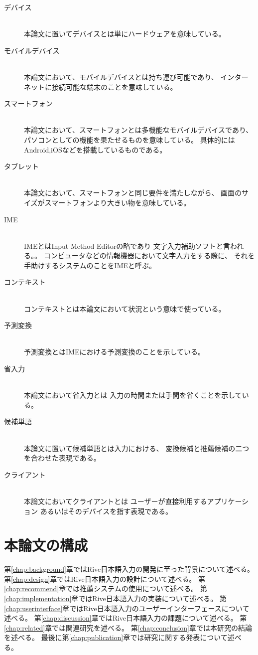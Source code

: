 \begin{description}
  \item[デバイス]\mbox{}\\
    本論文に置いてデバイスとは単にハードウェアを意味している。
  \item[モバイルデバイス]\mbox{}\\
    本論文において、モバイルデバイスとは持ち運び可能であり、
    インターネットに接続可能な端末のことを意味している。
  \item[スマートフォン]\mbox{}\\
    本論文において、スマートフォンとは多機能なモバイルデバイスであり、
    パソコンとしての機能を果たせるものを意味している。
    具体的にはAndroid,iOSなどを搭載しているものである。
  \item[タブレット]\mbox{}\\
    本論文において、スマートフォンと同じ要件を満たしながら、
    画面のサイズがスマートフォンより大きい物を意味している。
  \item[IME]\mbox{}\\
    IMEとはInput Method Editorの略であり
    文字入力補助ソフトと言われる。。
    コンピュータなどの情報機器において文字入力をする際に、
    それを手助けするシステムのことをIMEと呼ぶ。
  \item[コンテキスト]\mbox{}\\
    コンテキストとは本論文において状況という意味で使っている。
  \item[予測変換]\mbox{}\\
    予測変換とはIMEにおける予測変換のことを示している。
  \item[省入力]\mbox{}\\
    本論文において省入力とは
    入力の時間または手間を省くことを示している。
  \item[候補単語]\mbox{}\\
    本論文に置いて候補単語とは入力における、
    変換候補と推薦候補の二つを合わせた表現である。
  \item[クライアント]\mbox{}\\
    本論文においてクライアントとは
    ユーザーが直接利用するアプリケーション
    あるいはそのデバイスを指す表現である。
\end{description}

\section{本論文の構成}
第\ref{chap:background}章ではRive日本語入力の開発に至った背景について述べる。
第\ref{chap:design}章ではRive日本語入力の設計について述べる。
第\ref{chap:recommend}章では推薦システムの使用について述べる。
第\ref{chap:implementation}章ではRive日本語入力の実装について述べる。
第\ref{chap:userinterface}章ではRive日本語入力のユーザーインターフェースについて述べる。
第\ref{chap:discussion}章ではRive日本語入力の課題について述べる。
第\ref{chap:related}章では関連研究を述べる。
第\ref{chap:conclusion}章では本研究の結論を述べる。
最後に第\ref{chap:publication}章では研究に関する発表について述べる。
